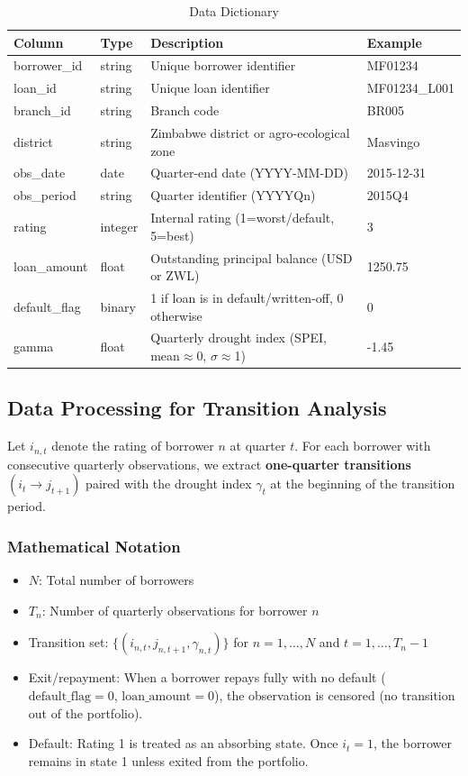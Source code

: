 \documentclass[12pt,a4paper]{article}
\begin{document}
\begin{table}[H]
\centering
\caption{Data Dictionary}
\label{tab:data_dictionary}
\begin{tabular}{@{}llll@{}}
\toprule
\textbf{Column} & \textbf{Type} & \textbf{Description} & \textbf{Example} \\
\midrule
borrower\_id & string & Unique borrower identifier & MF01234 \\
loan\_id & string & Unique loan identifier & MF01234\_L001 \\
branch\_id & string & Branch code & BR005 \\
district & string & Zimbabwe district or agro-ecological zone & Masvingo \\
obs\_date & date & Quarter-end date (YYYY-MM-DD) & 2015-12-31 \\
obs\_period & string & Quarter identifier (YYYYQn) & 2015Q4 \\
rating & integer & Internal rating (1=worst/default, 5=best) & 3 \\
loan\_amount & float & Outstanding principal balance (USD or ZWL) & 1250.75 \\
default\_flag & binary & 1 if loan is in default/written-off, 0 otherwise & 0 \\
gamma & float & Quarterly drought index (SPEI, mean$\approx$0, $\sigma\approx$1) & -1.45 \\
\bottomrule
\end{tabular}
\end{table}

\subsection{Data Processing for Transition Analysis}

Let $i_{n,t}$ denote the rating of borrower $n$ at quarter $t$. For each borrower with consecutive quarterly observations, we extract \textbf{one-quarter transitions} $(i_t \to j_{t+1})$ paired with the drought index $\gamma_t$ at the beginning of the transition period.

\subsubsection*{Mathematical Notation}
\begin{itemize}[noitemsep]
    \item $N$: Total number of borrowers
    \item $T_n$: Number of quarterly observations for borrower $n$
    \item Transition set: $\{(i_{n,t}, j_{n,t+1}, \gamma_{n,t})\}$ for $n = 1,\ldots,N$ and $t = 1,\ldots,T_n-1$
    \item Exit/repayment: When a borrower repays fully with no default ($\text{default\_flag}=0$, $\text{loan\_amount}=0$), the observation is censored (no transition out of the portfolio).
    \item Default: Rating 1 is treated as an absorbing state. Once $i_t = 1$, the borrower remains in state 1 unless exited from the portfolio.
\end{itemize}
\end{document}
